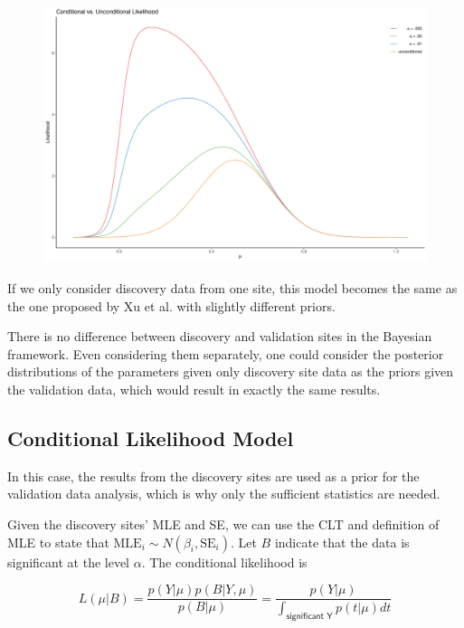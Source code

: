 \documentclass[AMA,STIX1COL]{WileyNJD-v2}\usepackage[]{graphicx}\usepackage[]{color}
\makeatletter
\def\maxwidth{ %
  \ifdim\Gin@nat@width>\linewidth
    \linewidth
  \else
    \Gin@nat@width
  \fi
}
\newenvironment{knitrout}{}{} %
\makeatother
\begin{document}
\begin{figure}
\begin{knitrout}
\color{fgcolor}
\includegraphics[width=\maxwidth]{figure/unnamed-chunk-3-1} 

\end{knitrout}
\end{figure}

If we only consider discovery data from one site, this model becomes the same as the one proposed by Xu et al. with slightly different priors.

There is no difference between discovery and validation sites in the Bayesian framework. Even considering them separately, one could consider the posterior distributions of the parameters given only discovery site data as the priors given the validation data, which would result in exactly the same results. 

\subsection{Conditional Likelihood Model}

In this case, the results from the discovery sites are used as a prior for the validation data analysis, which is why only the sufficient statistics are needed.

Given the discovery sites' MLE and SE, we can use the CLT and definition of MLE to state that $\text{MLE}_i \sim N(\beta_i, \text{SE}_i)$. Let $B$ indicate that the data is significant at the level $\alpha$. The conditional likelihood is

\begin{equation}\label{eq4}
L(\mu | B) = \frac{p(Y| \mu)p(B| Y,\mu)}{p(B|\mu)} =  \frac{p(Y| \mu)}{\int_{\textsf{significant Y}} p(t| \mu) dt }
\end{equation}
\end{document}
